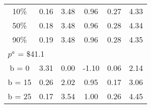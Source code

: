 \begin{tabular}{cccccc}
10\% & 0.16 & 3.48 & 0.96 & 0.27 & 4.33 \\
50\% & 0.18 & 3.48 & 0.96 & 0.28 & 4.34 \\
90\% & 0.19 & 3.48 & 0.96 & 0.28 & 4.35 \\
\midrule




\multicolumn{6}{l}{$p^a$ = \$41.1}  \\

 b = 0  &  3.31 &  0.00 & -1.10 &  0.06 &  2.14 \\
 b = 15 & 0.26 &  2.02 &  0.95 &  0.17 &  3.06 \\
 b = 25 & 0.17 &  3.54 &  1.00 &  0.26 &  4.45 \\

\bottomrule

\end{tabular}